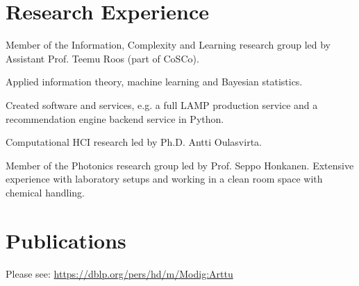 \documentclass[]{deedy-resume-openfont}
\begin{document}
\begin{minipage}[t]{0.66\textwidth}

\section{Research Experience}
\begin{tightemize}
\item Member of the Information, Complexity and Learning research group led by Assistant Prof. Teemu Roos (part of CoSCo).
\item Applied information theory, machine learning and Bayesian statistics.
\item Created software and services, e.g. a full LAMP production service and a recommendation engine backend service in Python.
\end{tightemize}

\begin{tightemize}
\item Computational HCI research led by Ph.D. Antti Oulasvirta.
\end{tightemize}

\begin{tightemize}
\item Member of the Photonics research group led by Prof. Seppo Honkanen. Extensive experience with laboratory setups and working in a clean room space with chemical handling.
\end{tightemize}


\section{Publications} 
\renewcommand\refname{\vskip -0.8cm} %
%
%
Please see: \href{https://dblp.org/pers/hd/m/Modig:Arttu}{https://dblp.org/pers/hd/m/Modig:Arttu}

\end{minipage} 
\end{document}
